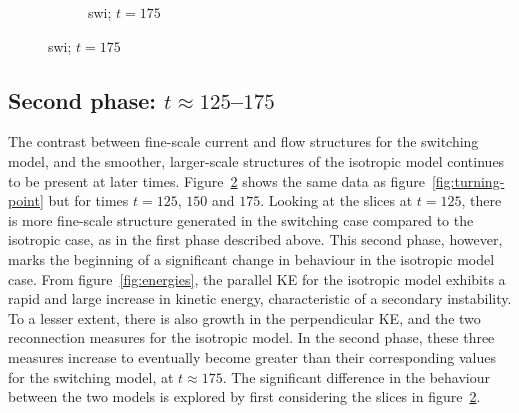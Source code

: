 \begin{figure}[t]
\begin{subfigure}[t]{0.32\textwidth}
    \caption{swi; $t=175$}
    \label{fig:final_switching_current_density_0035}
  \end{subfigure}
  \label{fig:feedback-reconnection}
\end{figure}

\subsection{Second phase: $t\approx125$--$175$}
The contrast between fine-scale current and flow structures for the switching model, and the smoother, larger-scale structures of the isotropic model continues to be present at later times. Figure~\ref{fig:feedback-reconnection} shows the same data as figure~\ref{fig:turning-point} but for times $t=125$, $150$ and $175$. Looking at the slices at $t=125$, there is more fine-scale structure generated in the switching case compared to the isotropic case, as in the first phase described above. This second phase, however, marks the beginning of a significant change in behaviour in the isotropic model case. From figure~\ref{fig:energies}, the parallel KE for the isotropic model exhibits a rapid and large increase in kinetic energy, characteristic of a secondary instability. To a lesser extent, there is also growth in the perpendicular KE, and the two reconnection measures for the isotropic model. In the second phase, these three measures increase to eventually become greater than their corresponding values for the switching model, at $t\approx175$. The significant difference in the behaviour between the two models is explored by first considering the slices in figure~\ref{fig:feedback-reconnection}.

